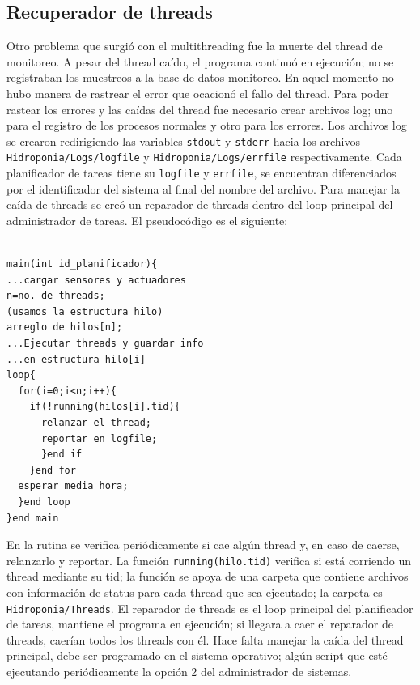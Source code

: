 \documentclass[a4paper,10pt,titlepage]{article}
\begin{document}
\subsection{Recuperador de threads}
Otro problema que surgi\'o con el multithreading fue la muerte del thread de monitoreo. A pesar del thread ca\'ido, el programa continu\'o en ejecuci\'on; no se registraban 
los muestreos a la base de datos monitoreo. En aquel momento no hubo manera de rastrear el error que ocacion\'o el fallo del thread. Para poder rastear los errores y las 
ca\'idas del thread fue necesario crear archivos log; uno para el registro de los procesos normales y otro para los errores. Los archivos log se crearon 
redirigiendo las variables \verb|stdout| y \verb|stderr| hacia los archivos \verb|Hidroponia/Logs/logfile| y \verb|Hidroponia/Logs/errfile| respectivamente. Cada 
planificador de tareas tiene su \verb|logfile| y \verb|errfile|, se encuentran diferenciados por el identificador del sistema al final del nombre del archivo. Para manejar 
la 
ca\'ida de threads se cre\'o un 
reparador de threads dentro del loop principal del administrador de tareas. El pseudoc\'odigo es el siguiente:

\begin{verbatim}

main(int id_planificador){
...cargar sensores y actuadores
n=no. de threads;
(usamos la estructura hilo)
arreglo de hilos[n];
...Ejecutar threads y guardar info 
...en estructura hilo[i]
loop{
  for(i=0;i<n;i++){
    if(!running(hilos[i].tid){
      relanzar el thread;
      reportar en logfile;
      }end if
    }end for
  esperar media hora;
  }end loop
}end main
\end{verbatim}

En la rutina se verifica peri\'odicamente si cae alg\'un thread y, en caso de caerse, relanzarlo y reportar. La funci\'on \verb|running(hilo.tid)| verifica si est\'a 
corriendo un thread mediante su tid; la funci\'on se apoya de una carpeta que contiene archivos con informaci\'on de status para cada thread que sea ejecutado; la carpeta es 
\verb|Hidroponia/Threads|. 
El reparador de threads 
es el loop principal del planificador de 
tareas, mantiene el programa en ejecuci\'on; si llegara a caer el reparador de threads, caer\'ian todos los threads con \'el. Hace falta manejar la ca\'ida del thread 
principal, debe ser programado en el sistema operativo; alg\'un script que est\'e ejecutando peri\'odicamente la opci\'on 2 del administrador de sistemas.
\end{document}
